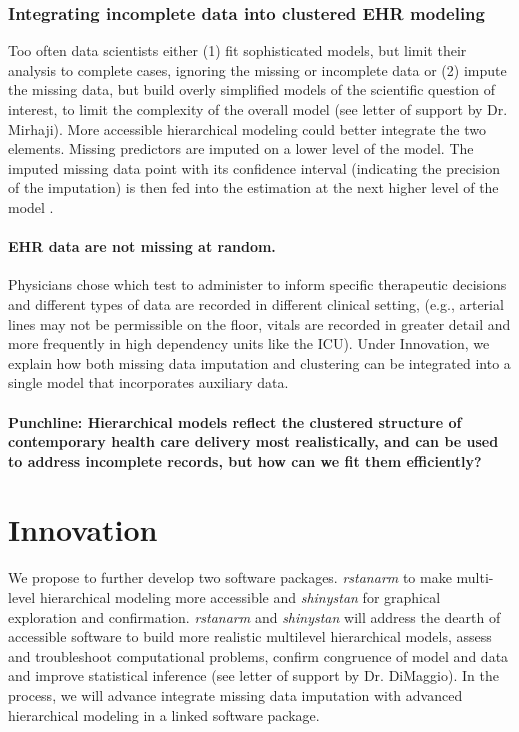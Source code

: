 \documentclass[11pt,notitlepage]{article}
\begin{document}
\section*{Integrating incomplete data into clustered EHR modeling}
Too often data scientists either (1) fit sophisticated models, but limit their analysis 
to complete cases, ignoring the missing or incomplete data or (2) impute the missing 
data, but build overly simplified models of the scientific question of interest, 
to limit the complexity of the overall model (see letter of support by Dr. Mirhaji). 
More accessible hierarchical modeling could better integrate the two elements. 
Missing predictors are imputed on a lower level of the model. The imputed missing 
data point with its confidence interval (indicating the precision of the imputation) 
is then fed into the estimation at the next higher level of the model
 \cite{Gelman2001imputation}. 

\subsection*{EHR data are not missing at random.}
Physicians chose which test 
to administer 
to inform specific therapeutic decisions and different types of data are recorded 
in different clinical setting, (e.g., arterial lines may not be permissible on the 
floor, vitals are recorded in greater detail and more frequently in high dependency 
units like the ICU). Under Innovation, we explain  how both missing data 
imputation and clustering can be integrated into a single model that 
incorporates auxiliary data.

\subsection*{Punchline: Hierarchical models reflect the clustered structure of contemporary health care 
delivery most realistically, and can be used to address incomplete records, but how can we fit them efficiently?}

\part*{Innovation}

We propose to further develop two software packages. \textit{rstanarm} to make 
multi-level hierarchical modeling more accessible and \textit{shinystan} 
for graphical exploration and confirmation. \textit{rstanarm} and 
\textit{shinystan} will address the dearth of accessible software 
to build more realistic multilevel hierarchical models, assess and 
troubleshoot computational problems, confirm congruence of model and data 
and improve statistical inference (see letter of support by Dr. DiMaggio). 
In the process, we will advance integrate missing data imputation with 
advanced hierarchical modeling in a linked software package.  
\end{document}
